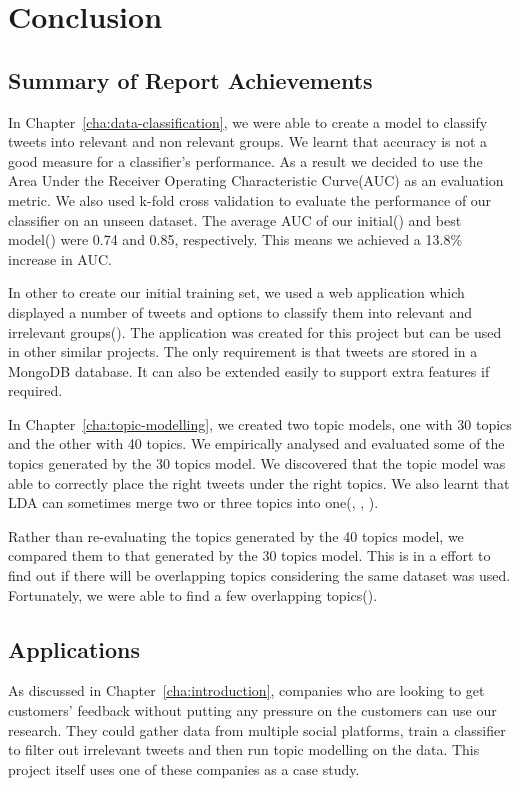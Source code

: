 
\chapter{Conclusion}
\label{ch:conclusions}

\section{Summary of Report Achievements}
In Chapter~\ref{cha:data-classification}, we were able to create a model to classify tweets into
relevant and non relevant groups. We learnt that accuracy is not a good measure for a classifier's
performance. As a result we decided to use the Area Under the Receiver Operating Characteristic
Curve(AUC) as an evaluation metric. We also used k-fold cross validation to evaluate the performance
of our classifier on an unseen dataset. The average AUC of our
initial() and best
model() were 0.74 and 0.85, respectively. This means we
achieved a 13.8\% increase in AUC.

In other to create our initial training set, we used a web application which displayed a number of
tweets and options to classify them into relevant and irrelevant groups(). The
application was created for this project but can be used in other similar projects. The only
requirement is that tweets are stored in a MongoDB database. It can also be extended easily to
support extra features if required.

In Chapter~\ref{cha:topic-modelling}, we created two topic models, one with 30 topics and the other
with 40 topics. We empirically analysed and evaluated some of the topics generated by the 30 topics
model. We discovered that the topic model was able to correctly place the right tweets under the
right topics. We also learnt that LDA can sometimes merge two or three topics into
one(, , ).

Rather than re-evaluating the topics generated by the 40 topics model, we compared them to that
generated by the 30 topics model. This is in a effort to find out if there will be overlapping
topics considering the same dataset was used. Fortunately, we were able to find a few overlapping
topics().

\section{Applications}
As discussed in Chapter~\ref{cha:introduction}, companies who are looking to get customers'
feedback without putting any pressure on the customers can use our research. They could gather data
from multiple social platforms, train a classifier to filter out irrelevant tweets and then run
topic modelling on the data. This project itself uses one of these companies as a case study.

